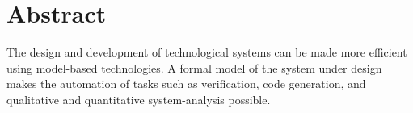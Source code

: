 \chapter*{Abstract}

The design and development of technological systems can be made more efficient using model-based technologies. A formal model of the system under design makes the automation of tasks such as verification, code generation, and qualitative and quantitative system-analysis possible.
\\\\



\vfill
\selectthesislanguage

\setcounter{romanPage}{\value{page}}
